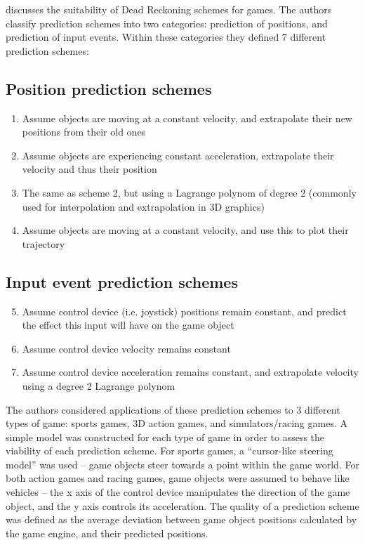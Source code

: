 \documentclass[conference]{IEEEtran}
\begin{document}
	\Textcite{pantel2002suitability} discusses the suitability of Dead Reckoning schemes for games. The authors classify prediction schemes into two categories: prediction of positions, and prediction of input events. Within these categories they defined 7 different prediction schemes:

	\subsection{Position prediction schemes}

	\begin{enumerate}
		\item Assume objects are moving at a constant velocity, and extrapolate their new positions from their old ones
		\item Assume objects are experiencing constant acceleration, extrapolate their velocity and thus their position
		\item The same as scheme 2, but using a Lagrange polynom of degree 2 (commonly used for interpolation and extrapolation in 3D graphics)
		\item Assume objects are moving at a constant velocity, and use this to plot their trajectory
	\end{enumerate}

	\subsection{Input event prediction schemes}

	\begin{enumerate}
		\setcounter{enumi}{4}
		\item Assume control device (i.e. joystick) positions remain constant, and predict the effect this input will have on the game object
		\item Assume control device velocity remains constant
		\item Assume control device acceleration remains constant, and extrapolate velocity using a degree 2 Lagrange polynom
	\end{enumerate}

	The authors considered applications of these prediction schemes to 3 different types of game: sports games, 3D action games, and simulators/racing games. A simple model was constructed for each type of game in order to assess the viability of each prediction scheme. For sports games, a ``cursor-like steering model'' was used -- game objects steer towards a point within the game world. For both action games and racing games, game objects were assumed to behave like vehicles -- the x axis of the control device manipulates the direction of the game object, and the y axis controls its acceleration. The quality of a prediction scheme was defined as the average deviation between game object positions calculated by the game engine, and their predicted positions.
\end{document}
